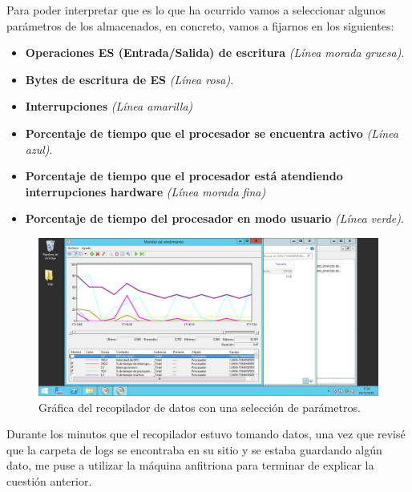 Para poder interpretar que es lo que ha ocurrido vamos a seleccionar algunos parámetros de los almacenados, en concreto, vamos a fijarnos en los siguientes:
\begin{itemize}
  \item \textbf{Operaciones ES (Entrada/Salida) de escritura} \textit{(Línea morada gruesa)}.
  \item \textbf{Bytes de escritura de ES} \textit{(Línea rosa)}.
  \item \textbf{Interrupciones} \textit{(Línea amarilla)}
  \item \textbf{Porcentaje de tiempo que el procesador se encuentra activo} \textit{(Línea azul)}.
  \item \textbf{Porcentaje de tiempo que el procesador está atendiendo interrupciones hardware} \textit{(Línea morada fina)}
  \item \textbf{Porcentaje de tiempo del procesador en modo usuario} \textit{(Línea verde)}.
\end{itemize}

\begin{figure}[H]
	\centering
	\includegraphics[scale=0.4]{recopilador-seleccion.png}
	\caption{Gráfica del recopilador de datos con una selección de parámetros.}
\end{figure}

Durante los minutos que el recopilador estuvo tomando datos, una vez que revisé que la carpeta de logs se encontraba en su sitio y se estaba guardando algún dato, me puse a utilizar la máquina anfitriona para terminar de explicar la cuestión anterior. \linebreak

